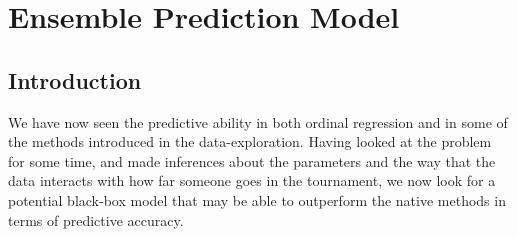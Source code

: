 \documentclass[10pt,a4paper, hidelinks]{article} %
\begin{document}


%


\section{Ensemble Prediction Model}
\subsection{Introduction}

We have now seen the predictive ability in both ordinal regression and in some of the methods introduced in the data-exploration. Having looked at the problem for some time, and made inferences about the parameters and the way that the data interacts with how far someone goes in the tournament, we now look for a potential black-box model that may be able to outperform the native methods in terms of predictive accuracy. 
\end{document}

